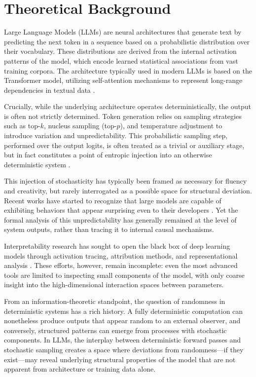 \documentclass[12pt]{article}
\begin{document}
\section{Theoretical Background}
Large Language Models (LLMs) are neural architectures that generate text by predicting the next token in a sequence based on a probabilistic distribution over their vocabulary. These distributions are derived from the internal activation patterns of the model, which encode learned statistical associations from vast training corpora. The architecture typically used in modern LLMs is based on the Transformer model, utilizing self-attention mechanisms to represent long-range dependencies in textual data \citep{brown2020language}.

Crucially, while the underlying architecture operates deterministically, the output is often not strictly determined. Token generation relies on sampling strategies such as top-$k$, nucleus sampling (top-$p$), and temperature adjustment to introduce variation and unpredictability. This probabilistic sampling step, performed over the output logits, is often treated as a trivial or auxiliary stage, but in fact constitutes a point of entropic injection into an otherwise deterministic system \citep{bengio2013representation}.

This injection of stochasticity has typically been framed as necessary for fluency and creativity, but rarely interrogated as a possible space for structural deviation. Recent works have started to recognize that large models are capable of exhibiting behaviors that appear surprising even to their developers \citep{bubeck2023sparks}. Yet the formal analysis of this unpredictability has generally remained at the level of system outputs, rather than tracing it to internal causal mechanisms.

Interpretability research has sought to open the black box of deep learning models through activation tracing, attribution methods, and representational analysis \citep{olah2020zoom}. These efforts, however, remain incomplete: even the most advanced tools are limited to inspecting small components of the model, with only coarse insight into the high-dimensional interaction spaces between parameters.

From an information-theoretic standpoint, the question of randomness in deterministic systems has a rich history. A fully deterministic computation can nonetheless produce outputs that appear random to an external observer, and conversely, structured patterns can emerge from processes with stochastic components. In LLMs, the interplay between deterministic forward passes and stochastic sampling creates a space where deviations from randomness---if they exist---may reveal underlying structural properties of the model that are not apparent from architecture or training data alone.
\end{document}
